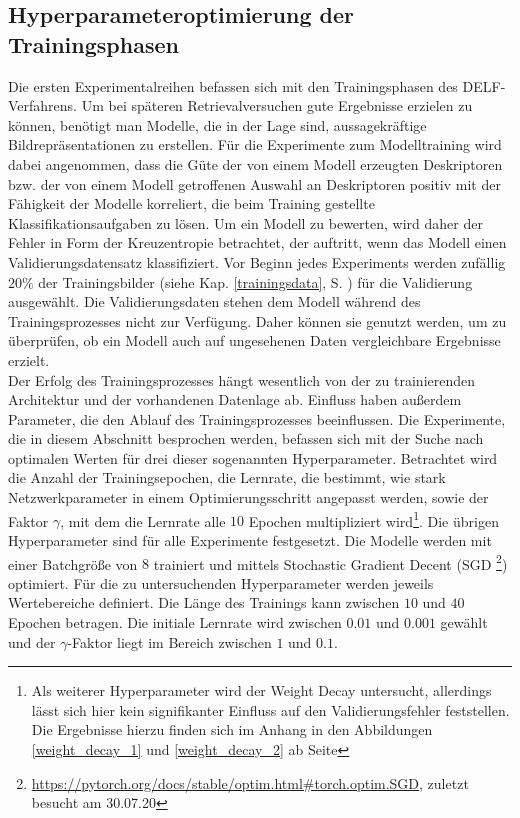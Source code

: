 \subsection{Hyperparameteroptimierung der Trainingsphasen}\label{hyperparam}
Die ersten Experimentalreihen befassen sich mit den Trainingsphasen des DELF-Verfahrens. Um bei späteren Retrievalversuchen gute Ergebnisse erzielen zu können, benötigt man Modelle, die in der Lage sind, aussagekräftige Bildrepräsentationen zu erstellen. Für die Experimente zum Modelltraining wird dabei angenommen, dass die Güte der von einem Modell erzeugten Deskriptoren bzw. der von einem Modell getroffenen Auswahl an Deskriptoren positiv mit der Fähigkeit der Modelle korreliert, die beim Training gestellte Klassifikationsaufgaben zu lösen. Um ein Modell zu bewerten, wird daher der Fehler in Form der Kreuzentropie betrachtet, der auftritt, wenn das Modell einen Validierungsdatensatz klassifiziert. Vor Beginn jedes Experiments werden zufällig $20\%$ der Trainingsbilder (siehe Kap. \ref{trainingsdata}, S. \pageref{trainingsdata}) für die Validierung ausgewählt. Die Validierungsdaten stehen dem Modell während des Trainingsprozesses nicht zur Verfügung. Daher können sie genutzt werden, um zu überprüfen, ob ein Modell auch auf ungesehenen Daten vergleichbare Ergebnisse erzielt.
\\
Der Erfolg des Trainingsprozesses hängt wesentlich von der zu trainierenden Architektur und der vorhandenen Datenlage ab. Einfluss haben außerdem Parameter, die den Ablauf des Trainingsprozesses beeinflussen. Die Experimente, die in diesem Abschnitt besprochen werden, befassen sich mit der Suche nach optimalen Werten für drei dieser sogenannten Hyperparameter. Betrachtet wird die Anzahl der Trainingsepochen, die Lernrate, die bestimmt, wie stark Netzwerkparameter in einem Optimierungsschritt angepasst werden, sowie der Faktor $\gamma$, mit dem die Lernrate alle $10$ Epochen multipliziert wird\footnote{Als weiterer Hyperparameter wird der Weight Decay untersucht, allerdings lässt sich hier kein signifikanter Einfluss auf den Validierungsfehler feststellen. Die Ergebnisse hierzu finden sich im Anhang in den Abbildungen \ref{weight_decay_1} und \ref{weight_decay_2} ab Seite \pageref{weight_decay_1}}. Die übrigen Hyperparameter sind für alle Experimente festgesetzt. Die Modelle werden mit einer Batchgröße von $8$ trainiert und mittels Stochastic Gradient Decent (SGD \footnote{\url{https://pytorch.org/docs/stable/optim.html\#torch.optim.SGD}, zuletzt besucht am 30.07.20}) optimiert. Für die zu untersuchenden Hyperparameter werden jeweils Wertebereiche definiert. Die Länge des Trainings kann zwischen $10$ und $40$ Epochen betragen. Die initiale Lernrate wird zwischen $0.01$ und $0.001$ gewählt und der $\gamma$-Faktor liegt im Bereich zwischen $1$ und $0.1$.
